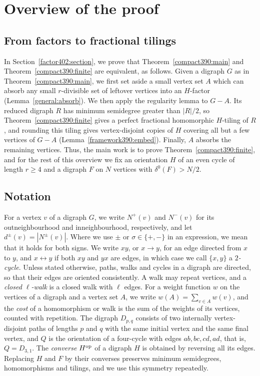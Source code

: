 \section{Overview of the proof}\label{sec:overview}
\subsection{From factors to fractional tilings}\label{sec:sketch-factor}
In Section~\ref{factor402:section}, we prove that Theorem~\ref{compact390:main} and Theorem~\ref{compact390:finite} are equivalent, as follows.
Given a digraph $G$ as in Theorem~\ref{compact390:main}, we first set aside a small vertex set $A$ which can absorb any small $r$-divisible set of leftover vertices into an $H$-factor (Lemma~\ref{general:absorb}).
We then apply the regularity lemma to $G-A$. Its reduced digraph $R$ has minimum semidegree greater than $|R|/2$, so Theorem~\ref{compact390:finite} gives a perfect fractional homomorphic $H$-tiling of $R$, and rounding this tiling gives vertex-disjoint copies of $H$ covering all but a few vertices of $G-A$ (Lemma~\ref{framework390:embed}). Finally, $A$ absorbs the remaining vertices.
Thus, the main work is to prove Theorem~\ref{compact390:finite}, and for the rest of this overview we fix an orientation $H$ of an even cycle of length $r\geq 4$ and a digraph $F$ on $N$ vertices with $\delta^0(F)>N/2$.

\subsection{Notation}\label{sec:notation}
For a vertex $v$ of a digraph $G$, we write $N^+(v)$ and $N^-(v)$ for its outneighbourhood and inneighbourhood, respectively, and let $d^\pm(v)=|N^\pm(v)|$. Where we use $\pm$ or $\sigma\in\{+,-\}$ in an expression, we mean that it holds for both signs.
We write $xy$, or $x\to y$, for an edge directed from $x$ to $y$, and $x\leftrightarrow y$ if both $xy$ and $yx$ are edges, in which case we call $\{x,y\}$ a \emph{$2$-cycle}.
Unless stated otherwise, paths, walks and cycles in a digraph are directed, so that their edges are oriented consistently. A walk may repeat vertices, and a \emph{closed $\ell$-walk} is a closed walk with $\ell$ edges.
For a weight function $w$ on the vertices of a digraph and a vertex set $A$, we write $w(A)=\sum_{v\in A}w(v)$, and the \emph{cost} of a homomorphism or walk is the sum of the weights of its vertices, counted with repetition.
The digraph $D_{p,q}$ consists of two internally vertex-disjoint paths of lengths $p$ and $q$ with the same initial vertex and the same final vertex, and $Q$ is the orientation of a four-cycle with edges $ab,bc,cd,ad$, that is, $Q=D_{3,1}$.
The \emph{converse} $H^{\rm op}$ of a digraph $H$ is obtained by reversing all its edges. Replacing $H$ and $F$ by their converses preserves minimum semidegrees, homomorphisms and tilings, and we use this symmetry repeatedly.

